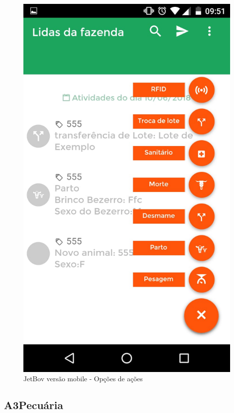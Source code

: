 \documentclass[12pt]{article}
\begin{document}
\begin{titlepage}
\begin{figure}[!h]
\begin{center}
\caption{JetBov versão mobile - Opções de ações}
\includegraphics[width=6in]{img/jetbovapp2.jpeg}

\end{center}
\end{figure}

\newpage

\subsection{A3Pecuária}


\end{titlepage}
\end{document}
